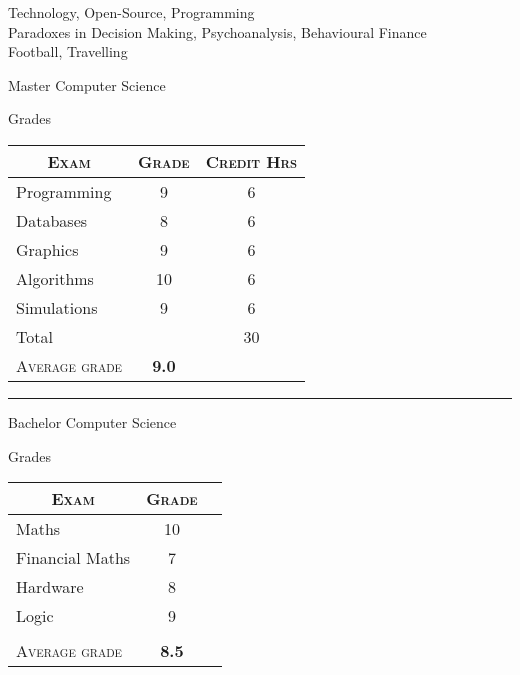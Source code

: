 \documentclass[a4paper,10pt]{article} %
\begin{document}
Technology, Open-Source, Programming\\
Paradoxes in Decision Making, Psychoanalysis, Behavioural Finance\\
Football, Travelling


\newpage


\par{\centering\Large \hypertarget{
grds %
}{
Master Computer Science %
} \par}\large{\centering Grades\par}\normalsize

\begin{center}
\begin{tabular}{lcc}
\multicolumn{1}{c}{\textsc{Exam}} & \textsc{Grade}&\textsc{Credit Hrs}\\ \hline
Programming		 	& 9 			& 6\\
Databases		 	& 8 			& 6\\
Graphics 			& 9 			& 6\\
Algorithms			& 10 			& 6\\
Simulations			& 9 			& 6\\
Total 				& 			& 30
\\\cline{2-3}
\textsc{Average grade}&\textbf{9.0}
\end{tabular}
\end{center}
\bigskip
\hrule
\bigskip


\bigskip

\par{\centering\Large \hypertarget{
grds_usc  %
}{
Bachelor Computer Science %
}\par}\large{\centering Grades\par}\normalsize

\begin{center}
\begin{tabular}{lcc}
\multicolumn{1}{c}{\textsc{Exam}} & \textsc{Grade}\\ 
\hline
Maths 			& 10 \\
Financial Maths 	& 7\\
Hardware 		& 8\\
Logic 			& 9\\
& &\\\cline{2-3}
\textsc{Average grade} & \textbf{8.5}
\end{tabular}
\end{center}

\end{document}
